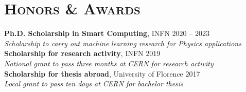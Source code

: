 \newcommand{\scholarship}[4]
  {\normalsize \textbf{\color{maincolor} #1},
  {\color{hlcolor-1} #2} \hfill {\color{hlcolor-2} #3}\\
  {\color{iconcolor} \faMedal} \emph{\color{maincolor} #4}}


\section*{\textsc{Honors \& Awards}}
\begin{cvcontent}
  \scholarship{Ph.D. Scholarship in Smart Computing}{INFN}{2020 -- 2023}{Scholarship to carry out machine learning research for Physics applications}
  \\ [2mm]
  \scholarship{Scholarship for research activity}{INFN}{2019}{National grant to pass three months at CERN for research activity}
  \\ [2mm]
  \scholarship{Scholarship for thesis abroad}{University of Florence}{2017}{Local grant to pass ten days at CERN for bachelor thesis}
\end{cvcontent}